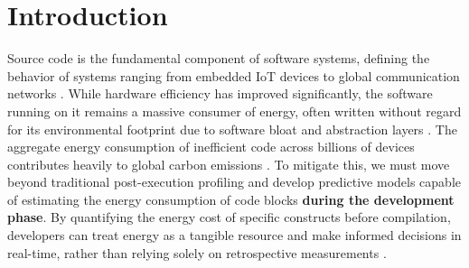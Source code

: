 \section{Introduction}





Source code is the fundamental component of software systems, defining the behavior of systems ranging from embedded IoT devices to global communication networks \cite{DiCosmo2017}. While hardware efficiency has improved significantly, the software running on it remains a massive consumer of energy, often written without regard for its environmental footprint due to software bloat and abstraction layers \cite{Wirth1995}. The aggregate energy consumption of inefficient code across billions of devices contributes heavily to global carbon emissions \cite{Belkhir2018, Freitag2021}. To mitigate this, we must move beyond traditional post-execution profiling and develop predictive models capable of estimating the energy consumption of code blocks \textbf{during the development phase}. By quantifying the energy cost of specific constructs before compilation, developers can treat energy as a tangible resource and make informed decisions in real-time, rather than relying solely on retrospective measurements \cite{Pang2016, Pinto2017}.  

